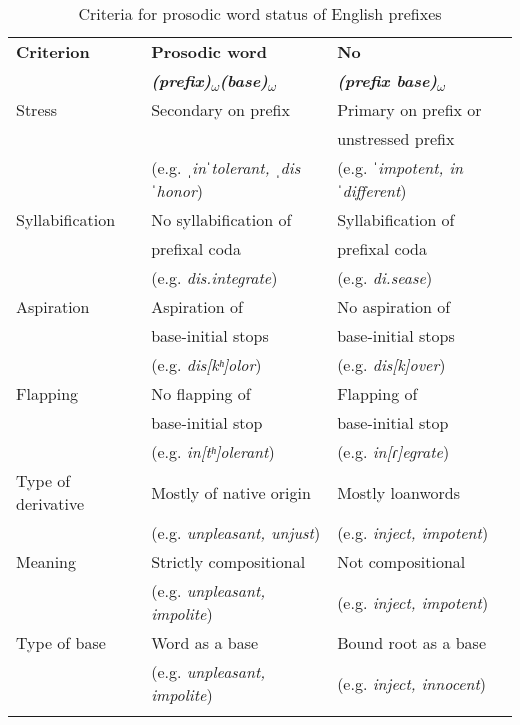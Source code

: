 \begin{table*}
	\caption{Criteria for prosodic word status of English prefixes \citep{Raffelsiefen.1999}}
	\label{tbl:Criteria for prosodic work status of English prefixes (Raffelsiefen 1999)}
		\begin{tabular}{lll}
				\lsptoprule
			\textbf{Criterion} & \textbf{Prosodic word }&\textbf{ No \isi{prosodic word} }\\ 
								&\textbf{\textit{(prefix)\textsubscript{$\omega$}(base)\textsubscript{$\omega$}}}& \textbf{\textit{(prefix base)\textsubscript{$\omega$}}}
			\\
			\midrule 

			Stress & Secondary \isi{stress} on prefix & Primary \isi{stress} on prefix or  \\ 
							& 												& unstressed prefix \\
							&(e.g. \textit{ˌinˈtolerant, ˌdisˈhonor}) & (e.g. \textit{ ˈimpotent, inˈdifferent})
			\\ 
			
			Syllabification & No syllabification of  & Syllabification of  \\
						              &  prefixal coda 				& prefixal coda \\
						              & (e.g. \textit{dis.integrate})& (e.g. \textit{di.sease}) 
			\\ 
			
			Aspiration & Aspiration of 		& No aspiration of  \\
						       & base-initial stops &  base-initial stops \\
						       & (e.g. \textit{dis[kʰ]olor}) & (e.g. \textit{dis[k]over})
			\\  
			

			Flapping & No flapping of  		& Flapping of\\
							 &  base-initial stop 	& base-initial stop\\
							& (e.g. \textit{in[tʰ]olerant}) & (e.g. \textit{in[ɾ]egrate})
			\\   

			Type of derivative & Mostly of native origin & Mostly loanwords \\ 
			& (e.g. \textit{unpleasant, unjust}) & (e.g. \textit{inject, impotent})
			\\ 
						
			Meaning & Strictly compositional & Not compositional\\
							& (e.g. \textit{unpleasant, impolite}) & (e.g. \textit{inject, impotent})
			\\  
			
			Type of base & Word as a base & Bound root as a base\\
										& (e.g. \textit{unpleasant, impolite}) & (e.g. \textit{inject, innocent})
			\\ 
			

						\lspbottomrule                                                                                
		\end{tabular}
\end{table*}


